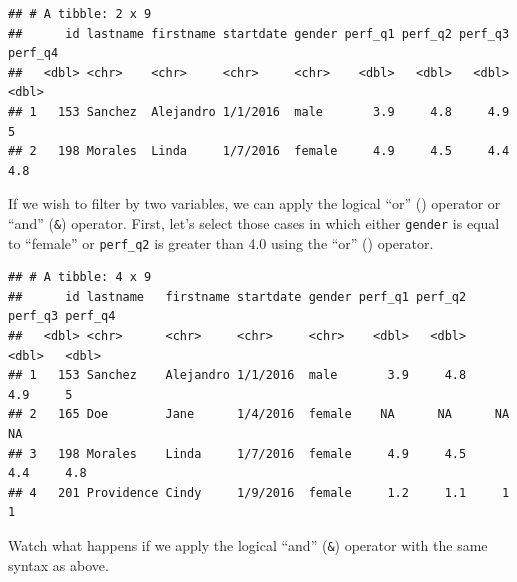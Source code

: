 \documentclass[]{book}
\newenvironment{Shaded}{\begin{snugshade}}{\end{snugshade}}
\newcommand{\KeywordTok}[1]{\textcolor[rgb]{0.13,0.29,0.53}{\textbf{#1}}}
\newcommand{\FloatTok}[1]{\textcolor[rgb]{0.00,0.00,0.81}{#1}}
\newcommand{\StringTok}[1]{\textcolor[rgb]{0.31,0.60,0.02}{#1}}
\newcommand{\CommentTok}[1]{\textcolor[rgb]{0.56,0.35,0.01}{\textit{#1}}}
\newcommand{\OperatorTok}[1]{\textcolor[rgb]{0.81,0.36,0.00}{\textbf{#1}}}
\newcommand{\NormalTok}[1]{#1}
\begin{document}
\begin{verbatim}
## # A tibble: 2 x 9
##      id lastname firstname startdate gender perf_q1 perf_q2 perf_q3 perf_q4
##   <dbl> <chr>    <chr>     <chr>     <chr>    <dbl>   <dbl>   <dbl>   <dbl>
## 1   153 Sanchez  Alejandro 1/1/2016  male       3.9     4.8     4.9     5  
## 2   198 Morales  Linda     1/7/2016  female     4.9     4.5     4.4     4.8
\end{verbatim}

If we wish to filter by two variables, we can apply the logical ``or''
(\texttt{\textbar{}}) operator or ``and'' (\texttt{\&}) operator. First,
let's select those cases in which either \texttt{gender} is equal to
``female'' or \texttt{perf\_q2} is greater than 4.0 using the ``or''
(\texttt{\textbar{}}) operator.

\begin{Shaded}
\end{Shaded}

\begin{verbatim}
## # A tibble: 4 x 9
##      id lastname   firstname startdate gender perf_q1 perf_q2 perf_q3 perf_q4
##   <dbl> <chr>      <chr>     <chr>     <chr>    <dbl>   <dbl>   <dbl>   <dbl>
## 1   153 Sanchez    Alejandro 1/1/2016  male       3.9     4.8     4.9     5  
## 2   165 Doe        Jane      1/4/2016  female    NA      NA      NA      NA  
## 3   198 Morales    Linda     1/7/2016  female     4.9     4.5     4.4     4.8
## 4   201 Providence Cindy     1/9/2016  female     1.2     1.1     1       1
\end{verbatim}

Watch what happens if we apply the logical ``and'' (\texttt{\&})
operator with the same syntax as above.

\begin{Shaded}
\end{Shaded}
\end{document}
